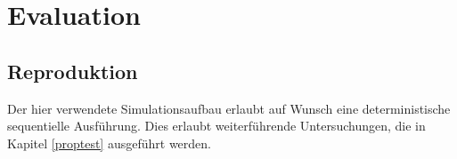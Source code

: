 \chapter{Evaluation}

\section{Reproduktion}
\label{reproduktion}

Der hier verwendete Simulationsaufbau erlaubt auf Wunsch eine deterministische sequentielle Ausführung. Dies erlaubt weiterführende Untersuchungen, die in Kapitel \ref{proptest} ausgeführt werden.


